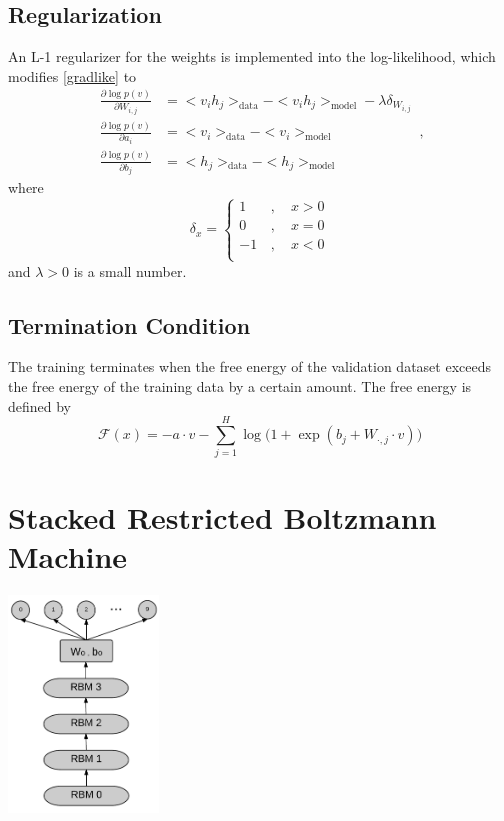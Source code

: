 \documentclass[a4paper,onecolumn]{article}
\theoremstyle{remark}
\begin{document}
\subsection{Regularization}
An L-1 regularizer for the weights is implemented into the log-likelihood, which modifies 
\eqref{gradlike} to
\begin{equation}\begin{split}
    \frac{\partial \log p(v)}{\partial W_{i,j}} &= 
    <v_i h_j>_{\textrm{data}} - <v_i h_j>_{\textrm{model}} - \lambda \delta_{W_{i,j}}\\
    \frac{\partial \log p(v)}{\partial a_i} &=
    <v_i>_{\textrm{data}} - <v_i>_{\textrm{model}}\\
    \frac{\partial \log p(v)}{\partial b_j} &=
    <h_j>_{\textrm{data}} - <h_j>_{\textrm{model}}
\end{split}\,,
\label{gradlike L1}
\end{equation}
where 
\begin{equation}
    \delta_x = \left\{\begin{split}
        1&\,,\quad x>0\\
        0&\,,\quad x=0\\
        -1&\,, \quad x<0\\
    \end{split}\right.
\end{equation}
and
$\lambda>0$ is a small number.

\subsection{Termination Condition}
The training terminates when the free energy 
of the validation dataset exceeds the free energy of the training data by a certain amount.
The free energy is defined by
\begin{equation}
    \mathcal{F}(x) = - a\cdot v - \sum_{j=1}^H 
    \log \Big(
    1 + \exp\left(b_j + W_{\cdot, j} \cdot v\right)
    \Big)
\end{equation}

\section{Stacked Restricted Boltzmann Machine}
\begin{center}
    \includegraphics[width=4cm]{stacked.png}
\end{center}
\end{document}

